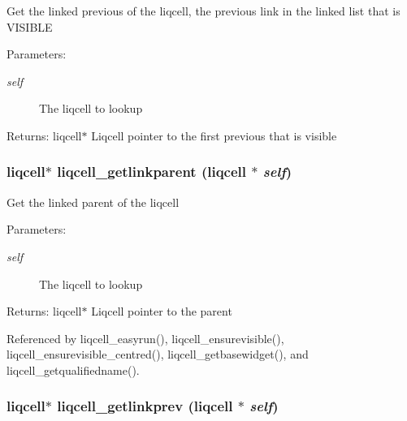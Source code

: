 Get the linked previous of the liqcell, the previous link in the linked list that is VISIBLE \begin{Desc}
\item[Parameters:]
\begin{description}
\item[{\em self}]The liqcell to lookup \end{description}
\end{Desc}
\begin{Desc}
\item[Returns:]liqcell$\ast$ Liqcell pointer to the first previous that is visible \end{Desc}
\subsubsection[{liqcell\_\-getlinkparent}]{\setlength{\rightskip}{0pt plus 5cm}liqcell$\ast$ liqcell\_\-getlinkparent (liqcell $\ast$ {\em self})}\label{d5/da2/liqcell_8c_edd0e88e37a725443f07fa04d7aaf06b}


Get the linked parent of the liqcell \begin{Desc}
\item[Parameters:]
\begin{description}
\item[{\em self}]The liqcell to lookup \end{description}
\end{Desc}
\begin{Desc}
\item[Returns:]liqcell$\ast$ Liqcell pointer to the parent \end{Desc}


Referenced by liqcell\_\-easyrun(), liqcell\_\-ensurevisible(), liqcell\_\-ensurevisible\_\-centred(), liqcell\_\-getbasewidget(), and liqcell\_\-getqualifiedname().
\subsubsection[{liqcell\_\-getlinkprev}]{\setlength{\rightskip}{0pt plus 5cm}liqcell$\ast$ liqcell\_\-getlinkprev (liqcell $\ast$ {\em self})}\label{d5/da2/liqcell_8c_8fbd0b45680e98ce91d83a31185c5ea9}


